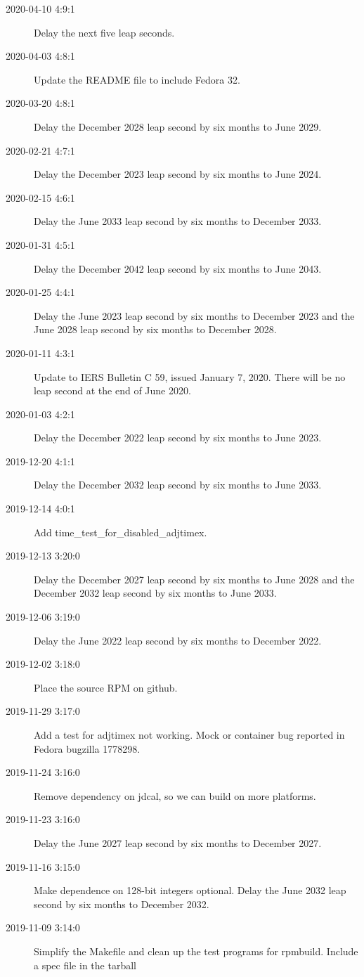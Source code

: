\documentclass[letterpaper,twoside]{article}
\begin{document}
\begin{description}
\item[2020-04-10 4:9:1]Delay the next five leap seconds.
\item[2020-04-03 4:8:1]Update the README file to include Fedora 32.
\item[2020-03-20 4:8:1]Delay the December 2028 leap second by six months
  to June 2029.
\item[2020-02-21 4:7:1]Delay the December 2023 leap second by six months
  to June 2024.
\item[2020-02-15 4:6:1]Delay the June 2033 leap second by six months
  to December 2033.
\item[2020-01-31 4:5:1]Delay the December 2042 leap second by six months
  to June 2043.
\item[2020-01-25 4:4:1]Delay the June 2023 leap second by six months
  to December 2023 and the June 2028 leap second by six months to December 2028.
\item[2020-01-11 4:3:1]Update to IERS Bulletin C 59, issued January 7, 2020.
  There will be no leap second at the end of June 2020.
\item[2020-01-03 4:2:1]Delay the December 2022 leap second by six months
  to June 2023.
\item[2019-12-20 4:1:1]Delay the December 2032 leap second by six months
  to June 2033.
\item[2019-12-14 4:0:1]Add {\ttfamily time\_test\_for\_disabled\_adjtimex}.
\item[2019-12-13 3:20:0]Delay the December 2027 leap second by six months
  to June 2028 and the December 2032 leap second by six months to June 2033.
\item[2019-12-06 3:19:0]Delay the June 2022 leap second by six months
  to December 2022.
\item[2019-12-02 3:18:0]Place the source RPM on github.
\item[2019-11-29 3:17:0]Add a test for adjtimex not working.
  Mock or container bug reported in Fedora bugzilla 1778298.
\item[2019-11-24 3:16:0]Remove dependency on jdcal, so we can build
  on more platforms.
\item[2019-11-23 3:16:0]Delay the June 2027 leap second by six months
  to December 2027.
\item[2019-11-16 3:15:0]Make dependence on 128-bit integers optional.
  Delay the June 2032 leap second by six months to December 2032.
\item[2019-11-09 3:14:0]Simplify the Makefile and clean up the
  test programs for rpmbuild.  Include a spec file in the tarball

\end{description}
\end{document}

